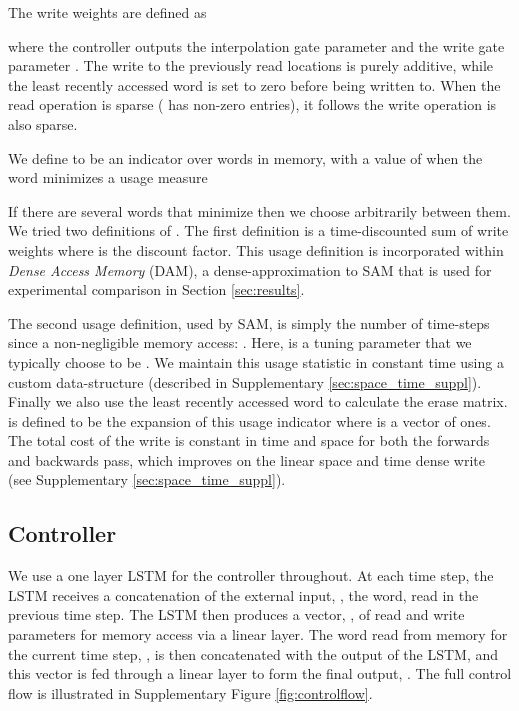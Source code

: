 \documentclass{article}
\begin{document}
The write weights are defined as


where the controller outputs the interpolation gate parameter  and the write gate parameter . The write to the previously read locations  is purely additive, while the least recently accessed word  is set to zero before being written to. When the read operation is sparse ( has  non-zero entries), it follows the write operation is also sparse.

We define  to be an indicator over words in memory, with a value of  when the word minimizes a usage measure 

If there are several words that minimize  then we choose arbitrarily between them. We tried two definitions of . The first definition is a time-discounted sum of write weights  where  is the discount factor.
This usage definition is incorporated within \textit{Dense Access Memory} (DAM), a dense-approximation to SAM that is used for experimental comparison in Section \ref{sec:results}.

The second usage definition, used by SAM, is simply the number of time-steps since a non-negligible memory access: .
Here,  is a tuning parameter that we typically choose to be . We maintain this usage statistic in constant time using a custom data-structure (described in Supplementary \ref{sec:space_time_suppl}). Finally we also use the least recently accessed word to calculate the erase matrix.  is defined to be the expansion of this usage indicator where  is a vector of ones. The total cost of the write is constant in time and space for both the forwards and backwards pass, which improves on the linear space and time dense write (see Supplementary \ref{sec:space_time_suppl}).









\subsection{Controller}

We use a one layer LSTM for the controller throughout.  At each time step, the LSTM receives a concatenation of the external input, , the word,  read in the previous time step.  The LSTM then produces a vector, , of read and write parameters for memory access via a linear layer.  The word read from memory for the current time step, , is then concatenated with the output of the LSTM, and this vector is fed through a linear layer to form the final output, . The full control flow is illustrated in Supplementary Figure \ref{fig:controlflow}.
\end{document}
